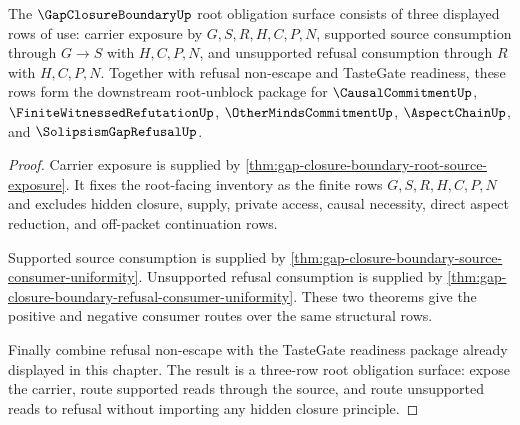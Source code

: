 \begin{theorem}\label{thm:gap-closure-boundary-root-unblock-package}
The $\GapClosureBoundaryUp$ root obligation surface consists of three displayed rows of use: carrier exposure by $G,S,R,H,C,P,N$, supported source consumption through $G \longrightarrow S$ with $H,C,P,N$, and unsupported refusal consumption through $R$ with $H,C,P,N$. Together with refusal non-escape and TasteGate readiness, these rows form the downstream root-unblock package for $\CausalCommitmentUp$, $\FiniteWitnessedRefutationUp$, $\OtherMindsCommitmentUp$, $\AspectChainUp$, and $\SolipsismGapRefusalUp$.
\end{theorem}
\begin{proof}
Carrier exposure is supplied by \autoref{thm:gap-closure-boundary-root-source-exposure}. It fixes the root-facing inventory as the finite rows $G,S,R,H,C,P,N$ and excludes hidden closure, supply, private access, causal necessity, direct aspect reduction, and off-packet continuation rows.

Supported source consumption is supplied by \autoref{thm:gap-closure-boundary-source-consumer-uniformity}. Unsupported refusal consumption is supplied by \autoref{thm:gap-closure-boundary-refusal-consumer-uniformity}. These two theorems give the positive and negative consumer routes over the same structural rows.

Finally combine refusal non-escape with the TasteGate readiness package already displayed in this chapter. The result is a three-row root obligation surface: expose the carrier, route supported reads through the source, and route unsupported reads to refusal without importing any hidden closure principle.
\end{proof}

